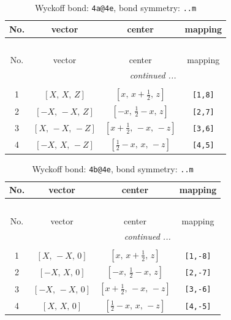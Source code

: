\documentclass[fleqn,8pt]{jsarticle}
\begin{document}
\begin{longtable}{cccc}
\caption{Wyckoff bond: {\tt 4a@4e}, bond symmetry: {\tt ..m}}
 \\
 \hline \hline
No. & vector & center & mapping \\ \hline \endfirsthead

\multicolumn{3}{l}{\tablename\ \thetable{}} \\
 \hline \hline
No. & vector & center & mapping \\ \hline \endhead

 \hline \hline
\multicolumn{3}{r}{\footnotesize\it continued ...} \\ \endfoot

 \hline \hline
\multicolumn{3}{r}{} \\ \endlastfoot

1 & $\left[ X,\, X,\, Z \right]$ & $\left[ x,\, x + \frac{1}{2},\, z \right]$ & {\tt [1,8]} \\ \hline
2 & $\left[ - X,\, - X,\, Z \right]$ & $\left[ - x,\, \frac{1}{2} - x,\, z \right]$ & {\tt [2,7]} \\ \hline
3 & $\left[ X,\, - X,\, - Z \right]$ & $\left[ x + \frac{1}{2},\, - x,\, - z \right]$ & {\tt [3,6]} \\ \hline
4 & $\left[ - X,\, X,\, - Z \right]$ & $\left[ \frac{1}{2} - x,\, x,\, - z \right]$ & {\tt [4,5]} \\
\end{longtable}
\renewcommand{\arraystretch}{1.2}
\begin{longtable}{cccc}
\caption{Wyckoff bond: {\tt 4b@4e}, bond symmetry: {\tt ..m}}
 \\
 \hline \hline
No. & vector & center & mapping \\ \hline \endfirsthead

\multicolumn{3}{l}{\tablename\ \thetable{}} \\
 \hline \hline
No. & vector & center & mapping \\ \hline \endhead

 \hline \hline
\multicolumn{3}{r}{\footnotesize\it continued ...} \\ \endfoot

 \hline \hline
\multicolumn{3}{r}{} \\ \endlastfoot

1 & $\left[ X,\, - X,\, 0 \right]$ & $\left[ x,\, x + \frac{1}{2},\, z \right]$ & {\tt [1,-8]} \\ \hline
2 & $\left[ - X,\, X,\, 0 \right]$ & $\left[ - x,\, \frac{1}{2} - x,\, z \right]$ & {\tt [2,-7]} \\ \hline
3 & $\left[ - X,\, - X,\, 0 \right]$ & $\left[ x + \frac{1}{2},\, - x,\, - z \right]$ & {\tt [3,-6]} \\ \hline
4 & $\left[ X,\, X,\, 0 \right]$ & $\left[ \frac{1}{2} - x,\, x,\, - z \right]$ & {\tt [4,-5]} \\
\end{longtable}
\end{document}
